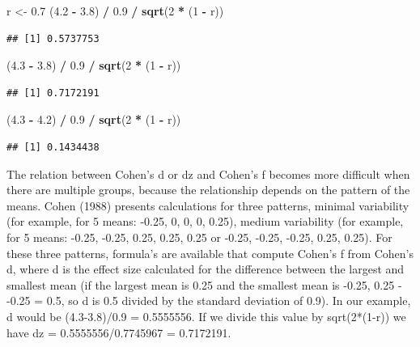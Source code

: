 \documentclass[]{book}
\newenvironment{Shaded}{\begin{snugshade}}{\end{snugshade}}
\newcommand{\DecValTok}[1]{\textcolor[rgb]{0.00,0.00,0.81}{#1}}
\newcommand{\FloatTok}[1]{\textcolor[rgb]{0.00,0.00,0.81}{#1}}
\newcommand{\KeywordTok}[1]{\textcolor[rgb]{0.13,0.29,0.53}{\textbf{#1}}}
\newcommand{\NormalTok}[1]{#1}
\newcommand{\OperatorTok}[1]{\textcolor[rgb]{0.81,0.36,0.00}{\textbf{#1}}}
\newcommand{\StringTok}[1]{\textcolor[rgb]{0.31,0.60,0.02}{#1}}
\begin{document}
\begin{Shaded}
\begin{Highlighting}[]
\NormalTok{  r <-}\StringTok{ }\FloatTok{0.7}
\NormalTok{  (}\FloatTok{4.2} \OperatorTok{-}\StringTok{ }\FloatTok{3.8}\NormalTok{) }\OperatorTok{/}\StringTok{ }\FloatTok{0.9} \OperatorTok{/}\StringTok{ }\KeywordTok{sqrt}\NormalTok{(}\DecValTok{2} \OperatorTok{*}\StringTok{ }\NormalTok{(}\DecValTok{1} \OperatorTok{-}\StringTok{ }\NormalTok{r))}
\end{Highlighting}
\end{Shaded}

\begin{verbatim}
## [1] 0.5737753
\end{verbatim}

\begin{Shaded}
\begin{Highlighting}[]
\NormalTok{  (}\FloatTok{4.3} \OperatorTok{-}\StringTok{ }\FloatTok{3.8}\NormalTok{) }\OperatorTok{/}\StringTok{ }\FloatTok{0.9} \OperatorTok{/}\StringTok{ }\KeywordTok{sqrt}\NormalTok{(}\DecValTok{2} \OperatorTok{*}\StringTok{ }\NormalTok{(}\DecValTok{1} \OperatorTok{-}\StringTok{ }\NormalTok{r))}
\end{Highlighting}
\end{Shaded}

\begin{verbatim}
## [1] 0.7172191
\end{verbatim}

\begin{Shaded}
\begin{Highlighting}[]
\NormalTok{  (}\FloatTok{4.3} \OperatorTok{-}\StringTok{ }\FloatTok{4.2}\NormalTok{) }\OperatorTok{/}\StringTok{ }\FloatTok{0.9} \OperatorTok{/}\StringTok{ }\KeywordTok{sqrt}\NormalTok{(}\DecValTok{2} \OperatorTok{*}\StringTok{ }\NormalTok{(}\DecValTok{1} \OperatorTok{-}\StringTok{ }\NormalTok{r))}
\end{Highlighting}
\end{Shaded}

\begin{verbatim}
## [1] 0.1434438
\end{verbatim}

The relation between Cohen's d or dz and Cohen's f becomes more difficult when there are multiple groups, because the relationship depends on the pattern of the means. Cohen (1988) presents calculations for three patterns, minimal variability (for example, for 5 means: -0.25, 0, 0, 0, 0.25), medium variability (for example, for 5 means: -0.25, -0.25, 0.25, 0.25, 0.25 or -0.25, -0.25, -0.25, 0.25, 0.25). For these three patterns, formula's are available that compute Cohen's f from Cohen's d, where d is the effect size calculated for the difference between the largest and smallest mean (if the largest mean is 0.25 and the smallest mean is -0.25, 0.25 - -0.25 = 0.5, so d is 0.5 divided by the standard deviation of 0.9). In our example, d would be (4.3-3.8)/0.9 = 0.5555556. If we divide this value by sqrt(2*(1-r)) we have dz = 0.5555556/0.7745967 = 0.7172191.
\end{document}
